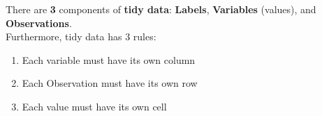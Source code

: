 \documentclass[english, 10pt]{article}
\begin{document}
There are \textbf{3} components of \textbf{tidy data}: \textbf{Labels},  \textbf{Variables} (values), and \textbf{Observations}.\\
Furthermore, tidy data has 3 rules:
\begin{enumerate}
	\item Each variable must have its own column
	\item Each Observation must have its own row
	\item Each value must have its own cell
\end{enumerate}
{

\centering






\begin{tikzpicture}[x=0.75pt,y=0.75pt,yscale=-1,xscale=1]


\end{tikzpicture}}
\end{document}

